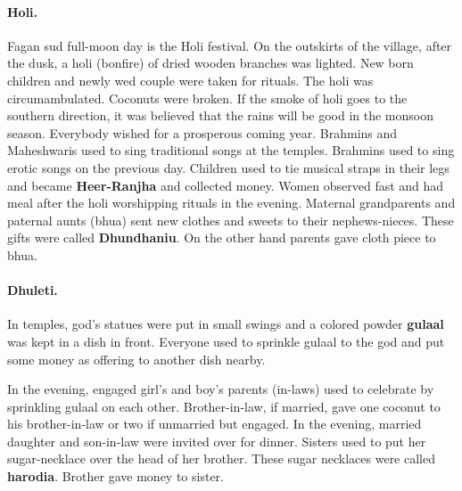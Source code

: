 \paragraph{Holi.} Fagan sud full-moon day is the Holi festival. On the
outskirts of the village, after the dusk, a holi (bonfire) of dried wooden branches was
lighted. New born children and newly wed couple were taken for rituals. The
holi was circumambulated. Coconuts were broken. If the smoke of holi goes to
the southern direction, it was believed that the rains will be good in the
monsoon season.  Everybody wished for a prosperous coming year. Brahmins and
Maheshwaris used to sing traditional songs at the temples. Brahmins used to
sing erotic songs on the previous day. Children used to tie musical straps in
their legs and became \textbf{Heer-Ranjha} and collected money. Women observed
fast and had meal after the holi worshipping rituals in the evening. Maternal
grandparents and paternal aunts (bhua) sent new clothes and sweets to their
nephews-nieces. These gifts were called \textbf{Dhundhaniu}. On the other hand
parents gave cloth piece to bhua.  \paragraph{Dhuleti.} In temples, god's
statues were put in small swings and a colored powder \textbf{gulaal} was kept
in a dish in front. Everyone used to sprinkle gulaal to the god and put some
money as offering to another dish nearby.

In the evening, engaged girl's and boy's parents (in-laws) used to celebrate by
sprinkling gulaal on each other. Brother-in-law, if married, gave one coconut to
his brother-in-law or two if unmarried but engaged. In the evening, married
daughter and son-in-law were invited over for dinner. Sisters used to put her
sugar-necklace over the head of her brother. These sugar necklaces were called
\textbf{harodia}. Brother gave money to sister.

